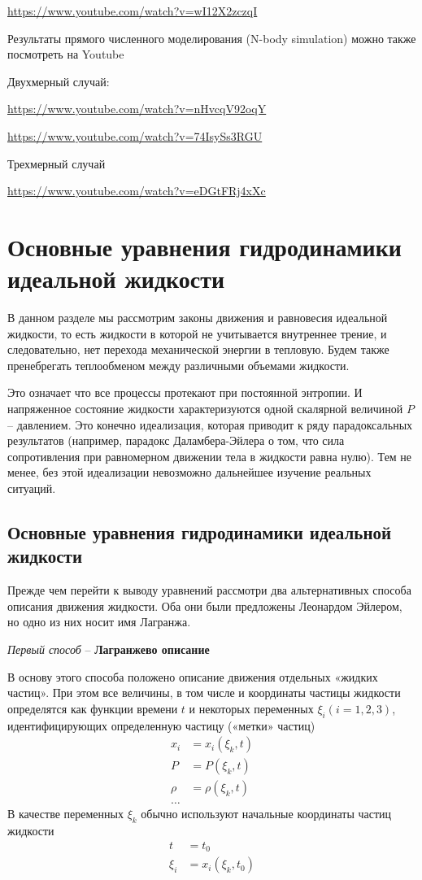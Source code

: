 \url{https://www.youtube.com/watch?v=wI12X2zczqI}

Результаты прямого численного моделирования (N-body simulation) можно также  посмотреть на Youtube

Двухмерный случай:

\url{https://www.youtube.com/watch?v=nHvcqV92oqY}

\url{https://www.youtube.com/watch?v=74IsySs3RGU}

Трехмерный случай

\url{https://www.youtube.com/watch?v=eDGtFRj4xXc}

\newpage
\section{Основные уравнения гидродинамики идеальной жидкости}

В  данном разделе мы рассмотрим законы движения и равновесия идеальной жидкости, то есть жидкости в которой не учитывается внутреннее трение, и следовательно, нет перехода механической энергии в тепловую. Будем также пренебрегать теплообменом между  различными объемами жидкости.

Это означает что все процессы протекают при постоянной энтропии. И напряженное состояние жидкости характеризуются одной скалярной величиной $P$ – давлением. Это конечно идеализация, которая приводит к ряду парадоксальных результатов (например, парадокс  Даламбера-Эйлера о том, что сила сопротивления при равномерном движении тела в жидкости равна нулю). Тем не менее, без этой идеализации невозможно дальнейшее изучение реальных ситуаций.
\subsection{Основные уравнения гидродинамики идеальной жидкости}
Прежде чем перейти к выводу уравнений рассмотри два альтернативных способа описания движения жидкости. Оба они были предложены Леонардом Эйлером, но одно из них носит имя Лагранжа.
\begin{center}
{\emph{Первый способ} – \textbf{Лагранжево описание}}
\end{center}
В основу этого способа положено описание движения отдельных «жидких частиц». При этом все величины, в том числе и  координаты частицы жидкости определятся как функции времени $t$  и некоторых переменных $\xi_i(i=1,2,3)$, идентифицирующих определенную частицу («метки» частиц)
\begin{align*}
	x_i &=x_i(\xi_k,t) \\
	P &=P(\xi_k,t) \\
	\rho &=\rho(\xi_k,t) \\
	\ldots 
\end{align*}
В качестве переменных $\xi_k$ обычно используют начальные координаты частиц жидкости
\begin{align*}
	t &=t_0 \\
	\xi_i &= x_i(\xi_k,t_0)
\end{align*}

